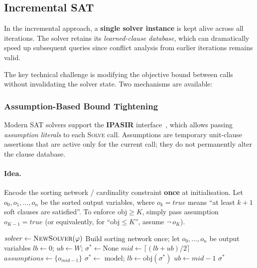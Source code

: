 \documentclass[11pt,a4paper]{article}
\begin{document}
\subsection{Incremental SAT}\label{sec:opt-incr}

In the incremental approach, a \textbf{single solver instance} is kept alive
across all iterations.  The solver retains its \emph{learned-clause database},
which can dramatically speed up subsequent queries since conflict analysis from
earlier iterations remains valid.

The key technical challenge is modifying the objective bound between calls
without invalidating the solver state.  Two mechanisms are available:

\subsubsection{Assumption-Based Bound Tightening}

Modern SAT solvers support the \textbf{IPASIR} interface~\cite{ipasir}, which
allows passing \emph{assumption literals} to each \textsc{Solve} call.
Assumptions are temporary unit-clause assertions that are active only for the
current call; they do not permanently alter the clause database.

\paragraph{Idea.}
Encode the sorting network / cardinality constraint \textbf{once} at
initialisation.  Let $o_0, o_1, \ldots, o_n$ be the sorted output variables,
where $o_k = \mathit{true}$ means ``at least $k{+}1$ soft clauses are
satisfied''.  To enforce $\mathrm{obj} \ge K$, simply pass assumption
$o_{K-1} = \mathit{true}$ (or equivalently, for ``$\mathrm{obj} \le K$'',
assume $\neg\, o_K$).

\begin{algorithm}[H]
\caption{Incremental Binary Search with Assumptions (maximisation)}
\label{alg:incr-binary}
\begin{algorithmic}[1]
\State $\mathit{solver} \leftarrow \textsc{NewSolver}(\varphi)$
\State Build sorting network once;
       let $o_0, \ldots, o_n$ be output variables
\State $lb \leftarrow 0$;\;\; $ub \leftarrow W$;\;\; $\sigma^* \leftarrow \text{None}$
    \State $\mathit{mid} \leftarrow \lceil(lb + ub)/2\rceil$
    \State $\mathit{assumptions} \leftarrow \{o_{\mathit{mid}-1}\}$
        \State $\sigma^* \leftarrow$ model;\;\;
               $lb \leftarrow \mathrm{obj}(\sigma^*)$
    \Else
        \State $ub \leftarrow \mathit{mid} - 1$
    \EndIf
\EndWhile
\State \Return $\sigma^*$
\end{algorithmic}
\end{algorithm}
\end{document}
